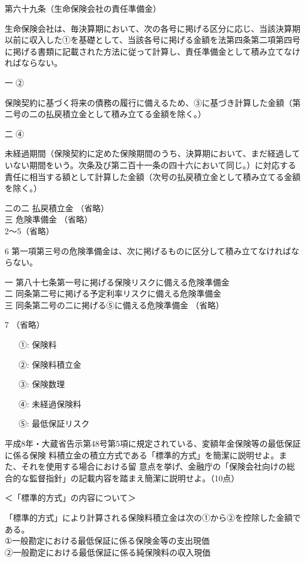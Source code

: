 \documentclass[report,gutter=10mm,fore-edge=10mm,uplatex,dvipdfmx]{jlreq}
\begin{document}
第六十九条（生命保険会社の責任準備金）

生命保険会社は、毎決算期において、次の各号に掲げる区分に応じ、当該決算期以前に収入した①を基礎として、当該各号に掲げる金額を法第四条第二項第四号に掲げる書類に記載された方法に従って計算し、責任準備金として積み立てなければならない。

一 ②

保険契約に基づく将来の債務の履行に備えるため、③に基づき計算した金額（第二号の二の払戻積立金として積み立てる金額を除く。）

二 ④

未経過期間（保険契約に定めた保険期間のうち、決算期において、まだ経過していない期間をいう。次条及び第二百十一条の四十六において同じ。）に対応する責任に相当する額として計算した金額（次号の払戻積立金として積み立てる金額を除く。）

二の二 払戻積立金 （省略）\\
三 危険準備金 （省略）\\
2〜5（省略）

6 第一項第三号の危険準備金は、次に掲げるものに区分して積み立てなければならない。

一 第八十七条第一号に掲げる保険リスクに備える危険準備金\\
二 同条第二号に掲げる予定利率リスクに備える危険準備金\\
三 同条第二号の二に掲げる⑤に備える危険準備金
（省略）

7 （省略）
\answer{}

\begin{itemize}
\item[ ①:] 保険料
\item[ ②:] 保険料積立金
\item[ ③:] 保険数理
\item[ ④:] 未経過保険料
\item[ ⑤:] 最低保証リスク
\end{itemize}

平成8年・大蔵省告示第48号第5項に規定されている、変額年金保険等の最低保証に係る保険
料積立金の積立方式である「標準的方式」を簡潔に説明せよ。また、それを使用する場合における留
意点を挙げ、金融庁の「保険会社向けの総合的な監督指針」の記載内容を踏まえ簡潔に説明せよ。（10点）

\answer{}
＜「標準的方式」の内容について＞

「標準的方式」により計算される保険料積立金は次の①から②を控除した金額である。\\
①一般勘定における最低保証に係る保険金等の支出現価\\
②一般勘定における最低保証に係る純保険料の収入現価
\end{document}
